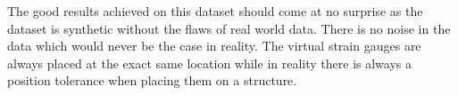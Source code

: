 \documentclass[conference]{IEEEtran}
\begin{document}
The good results achieved on this dataset should come at no surprise as the dataset is synthetic without the flaws of real world data. There is no noise in the data which would never be the case in reality. The virtual strain gauges are always placed at the exact same location while in reality there is always a position tolerance when placing them on a structure.








\newpage
\printbibliography
\end{document}
